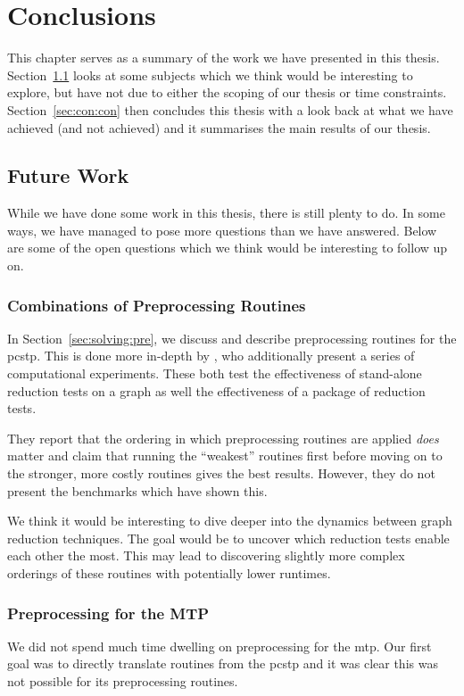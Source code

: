 {}
\chapter{Conclusions}
This chapter serves as a summary of the work we have presented in this thesis.
Section~\ref{sec:con:fut} looks at some subjects which we think would be
interesting to explore, but have not
due to either the scoping of our thesis or
time constraints.
Section~\ref{sec:con:con} then concludes this thesis with a look back at what we
have achieved (and not achieved) and it summarises the main results of our thesis.
\section{Future Work}\label{sec:con:fut}
While we have done some work in this thesis, there is still plenty to do. In some ways,
we have managed to pose more questions than we have answered. Below are some of the open
questions which we think would be interesting to follow up on.

\subsection{Combinations of Preprocessing Routines}
In Section~\ref{sec:solving:pre}, we discuss and describe preprocessing routines for
the \gls{pcstp}. This is done more in-depth by \citet{rehfeldt2016reduction}, who
additionally present a series of computational experiments. These both test
the effectiveness of stand-alone reduction tests on a graph
as well the effectiveness of a package of reduction tests.

They report that the ordering
in which preprocessing routines are applied \textit{does} matter and claim that running
the ``weakest'' routines first before moving on to the stronger, more costly routines
gives the best results.
However, they do not present the benchmarks which have shown this.

We think it would be interesting to dive deeper into the dynamics between graph reduction
techniques. The goal would be to uncover which reduction tests
enable each other the most. This may lead to discovering slightly more
complex orderings of these routines with potentially lower runtimes.

\subsection{Preprocessing for the MTP}
We did not spend much time dwelling on preprocessing for the \gls{mtp}. Our first goal was
to directly translate routines from the \gls{pcstp} and it was clear this was not possible
for its preprocessing routines.

